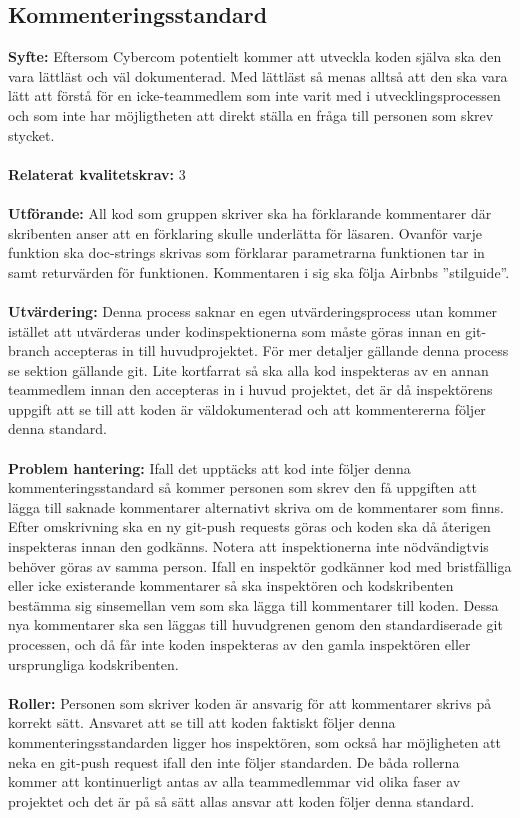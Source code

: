 \documentclass[10pt]{article}
\begin{document}
	\subsection{Kommenteringsstandard}
	\textbf{Syfte:}	Eftersom Cybercom potentielt kommer att utveckla koden själva ska den vara lättläst och väl dokumenterad. Med lättläst så menas alltså att den ska vara lätt att förstå för en icke-teammedlem som inte varit med i utvecklingsprocessen och som inte har möjligtheten att direkt ställa en fråga till personen som skrev stycket.
	\\\\
	\textbf{Relaterat kvalitetskrav:} 3 
	\\\\
	\textbf{Utförande:} All kod som gruppen skriver ska ha förklarande kommentarer där skribenten anser att en förklaring skulle underlätta för läsaren. Ovanför varje funktion ska doc-strings skrivas som förklarar parametrarna funktionen tar in samt returvärden för funktionen.
	Kommentaren i sig ska följa Airbnbs ''stilguide''\cite{bib-airbnb}.
	\\\\
	\textbf{Utvärdering:} Denna process saknar en egen utvärderingsprocess utan kommer istället att utvärderas under kodinspektionerna som måste göras innan en git-branch accepteras in till huvudprojektet\cite{bib-gitguide}. För mer detaljer gällande denna process se sektion gällande git. Lite kortfarrat så ska alla kod inspekteras av en annan teammedlem innan den accepteras in i huvud projektet, det är då inspektörens uppgift att se till att koden är väldokumenterad och att kommentererna följer denna standard. 
	\\\\
	\textbf{Problem hantering:} Ifall det upptäcks att kod inte följer denna kommenteringsstandard så kommer personen som skrev den få uppgiften att lägga till saknade kommentarer alternativt skriva om de kommentarer som finns. Efter omskrivning ska en ny git-push requests göras och koden ska då återigen inspekteras innan den godkänns. Notera att inspektionerna inte nödvändigtvis behöver göras av samma person.
	Ifall en inspektör godkänner kod med bristfälliga eller icke existerande kommentarer så ska inspektören och kodskribenten bestämma sig sinsemellan vem som ska lägga till kommentarer till koden. Dessa nya kommentarer ska sen läggas till huvudgrenen genom den standardiserade git processen, och då får inte koden inspekteras av den gamla inspektören eller ursprungliga kodskribenten.
	\\\\
	\textbf{Roller:} Personen som skriver koden är ansvarig för att kommentarer skrivs på korrekt sätt. Ansvaret att se till att koden faktiskt följer denna kommenteringsstandarden ligger hos inspektören, som också har möjligheten att neka en git-push request ifall den inte följer standarden. De båda rollerna kommer att kontinuerligt antas av alla teammedlemmar vid olika faser av projektet och det är på så sätt allas ansvar att koden följer denna standard.
	\\
	
\end{document}
